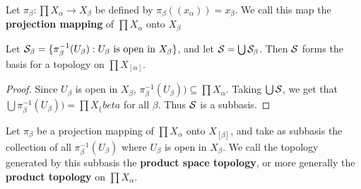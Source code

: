 \begin{definition}
    Let $\pi_{\beta}:\prod{X_{\alpha}} \rightarrow X_{\beta}$ be defined by
    $\pi_{\beta}((x_\alpha))=x_\beta$. We call this map the \textbf{projection mapping} of
    $\prod{X_{\alpha}}$ onto $X_{\beta}$		
\end{definition}

\begin{theorem}\label{2.1.2}
    Let $\mathcal{S}_{\beta}=\{\pi^{-1}_{\beta}(U_{\beta}):U_{\beta} \text{ is open in } X_{\beta}\}$, and let
    $\mathcal{S}=\bigcup{\mathcal{S}_{\beta}}$. Then $\mathcal{S}$ forms the basis for a topology on  $\prod{X_[\alpha]}$.
\end{theorem}
\begin{proof}
    Since $U_{\beta}$ is open in $X_{\beta}$, $\pi^{-1}_{\beta}(U_{\beta})) \subseteq
    \prod{X_\alpha}$. Taking $\bigcup{\mathcal{S}}$, we get that $\bigcup{\pi^{-1}_{\beta}(U_{\beta}))} =
    \prod{X_\{beta}$ for all $\beta$. Thus  $\mathcal{S}$ is a subbasis.
\end{proof}


\begin{definition}
    Let $\pi_{\beta}$ be a projection mapping of $\prod{X_{\alpha}}$ onto $X_[\beta]$, and take as
    subbasis the collection of all $\pi^{-1}_{\beta}(U_{\beta})$ where $U_{\beta}$ is open in
    $X_{\beta}$. We call the topology generated by this subbasis the \textbf{product space
    topology}, or more generally the \textbf{product topology} on $\prod{X_{\alpha}}$.		
\end{definition}
